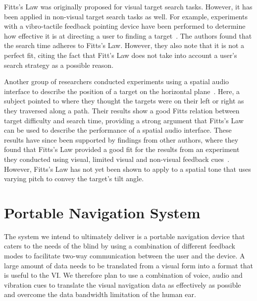 \documentclass[format=sigconf, review=true, screen=true, anonymous=true]{acmart}
\begin{document}
Fitts's Law was originally proposed for visual target search tasks. However, it has been applied in non-visual target search tasks as well. For example, experiments with a vibro-tactile feedback pointing device have been performed to determine how effective it is at directing a user to finding a target~\cite{ahmaniemi2009augmented}. The authors found that the search time adheres to Fitts's Law. However, they also note that it is not a perfect fit, citing the fact that Fitt's Law does not take into account a user's search strategy as a possible reason. 

Another group of researchers conducted experiments using a spatial audio interface to describe the position of a target on the horizontal plane~\cite{marentakis2006effects}. Here, a subject pointed to where they thought the targets were on their left or right as they traversed along a path. Their results show a good Fitts relation between target difficulty and search time, providing a strong argument that Fitts's Law can be used to describe the performance of a spatial audio interface. These results have since been supported by findings from other authors, where they found that Fitts's Law provided a good fit for the results from an experiment they conducted using visual, limited visual and non-visual feedback cues~\cite{wu2010fitts}. However, Fitts's Law has not yet been shown to apply to a spatial tone that uses varying pitch to convey the target's tilt angle.


\section{Portable Navigation System}
\label{sec:portable-navigation}

The system we intend to ultimately deliver is a portable navigation device that caters to the needs of the blind by using a combination of different feedback modes to facilitate two-way communication between the user and the device. A large amount of data needs to be translated from a visual form into a format that is useful to the VI. We therefore plan to use a combination of voice, audio and vibration cues to translate the visual navigation data as effectively as possible and overcome the data bandwidth limitation of the human ear. 
\end{document}
